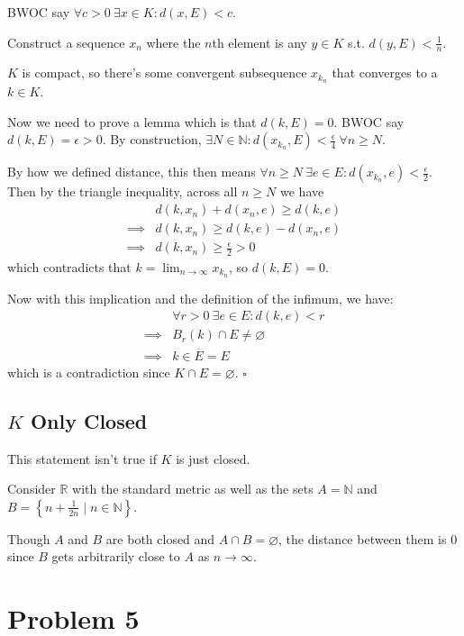\documentclass[12pt]{article}
\newcommand{\N}{\mathbb{N}}
\newcommand{\R}{\mathbb{R}}
\begin{document}
BWOC say $\forall c > 0\ \exists x \in K: d(x, E) < c$.

Construct a sequence $x_n$ where the $n$th element is any $y \in K$ s.t. $d(y, E) < \frac{1}{n}$.

$K$ is compact, so there's some convergent subsequence $x_{k_n}$ that converges to a $k \in K$.

Now we need to prove a lemma which is that $d(k, E)=0$.
BWOC say $d(k, E)=\epsilon > 0$.
By construction, $\exists N \in \N: d(x_{k_n}, E) < \frac{\epsilon}{4}\ \forall n \ge N$.

By how we defined distance, this then means $\forall n \ge N\ \exists e \in E: d(x_{k_n}, e) < \frac{\epsilon}{2}$.
Then by the triangle inequality, across all $n \ge N$ we have
\begin{align*}
  & d(k, x_n) + d(x_n, e) \ge d(k, e) \\
  \implies{} & d(k, x_n) \ge d(k, e) - d(x_n, e) \\
  \implies{} & d(k, x_n) \ge \frac{\epsilon}{2} > 0
\end{align*}
which contradicts that $k=\lim_{n \to \infty} x_{k_n}$, so $d(k, E)=0$.

Now with this implication and the definition of the infimum, we have:
\begin{align*}
             & \forall r > 0\ \exists e \in E: d(k, e) < r \\
  \implies{} & B_r(k) \cap E \ne \varnothing               \\
  \implies{} & k \in \overline{E}=E
\end{align*}
which is a contradiction since $K \cap E = \varnothing$. $\square$

\subsection{\texorpdfstring{$K$}{K} Only Closed}

This statement isn't true if $K$ is just closed.

Consider $\R$ with the standard metric as well as the sets $A=\N$ and $B=\left\{n+\frac{1}{2n} \mid n \in \N\right\}$.

Though $A$ and $B$ are both closed and $A \cap B = \varnothing$, the distance
between them is $0$ since $B$ gets arbitrarily close to $A$ as $n \to \infty$.

\pagebreak

\section{Problem 5}
\end{document}
